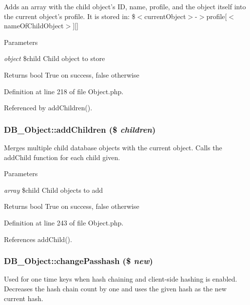 Adds an array with the child object's ID, name, profile, and the object itself into the current object's profile. It is stored in: \$$<$currentObject$>$-\/$>$profile\mbox{[}$<$nameOfChildObject$>$\mbox{]}\mbox{[}\mbox{]}


\begin{DoxyParams}{Parameters}
\item[{\em object}]\$child Child object to store\end{DoxyParams}
\begin{DoxyReturn}{Returns}
bool True on success, false otherwise 
\end{DoxyReturn}


Definition at line 218 of file Object.php.

Referenced by addChildren().\hypertarget{classDB__Object_aab1bdf6fa7b550f96f21292aa53bb052}{
\subsubsection[{addChildren}]{\setlength{\rightskip}{0pt plus 5cm}DB\_\-Object::addChildren (\$ {\em children})}}
\label{dc/d6d/classDB__Object_aab1bdf6fa7b550f96f21292aa53bb052}
Merges multiple child database objects with the current object. Calls the addChild function for each child given.


\begin{DoxyParams}{Parameters}
\item[{\em array}]\$child Child objects to add\end{DoxyParams}
\begin{DoxyReturn}{Returns}
bool True on success, false otherwise 
\end{DoxyReturn}


Definition at line 243 of file Object.php.

References addChild().\hypertarget{classDB__Object_a3f370bd811dc4f984150f220a5a7fd1c}{
\subsubsection[{changePasshash}]{\setlength{\rightskip}{0pt plus 5cm}DB\_\-Object::changePasshash (\$ {\em new})}}
\label{dc/d6d/classDB__Object_a3f370bd811dc4f984150f220a5a7fd1c}
Used for one time keys when hash chaining and client-\/side hashing is enabled. Decreases the hash chain count by one and uses the given hash as the new current hash.


